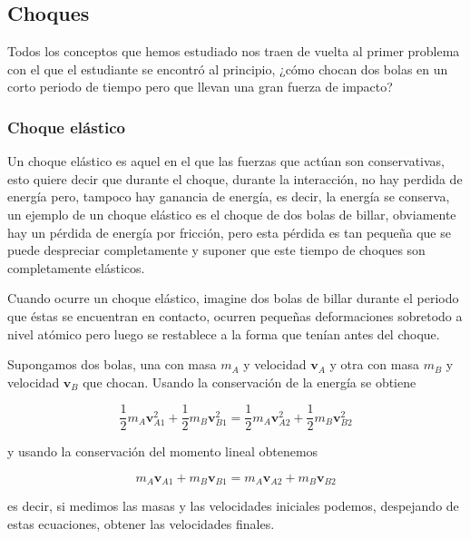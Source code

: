 \documentclass{article}
\begin{document}
\subsection{Choques}

Todos los conceptos que hemos estudiado nos traen de vuelta al primer problema con el que el estudiante se encontró al principio, ¿cómo chocan dos bolas en un corto periodo de tiempo pero que llevan una gran fuerza de impacto?

\subsubsection{Choque elástico}

Un choque elástico es aquel en el que las fuerzas que actúan son conservativas, esto quiere decir que durante el choque, durante la interacción, no hay perdida de energía pero, tampoco hay ganancia de energía, es decir, la energía se conserva, un ejemplo de un choque elástico es el choque de dos bolas de billar, obviamente hay un pérdida de energía por fricción, pero esta pérdida es tan pequeña que se puede despreciar completamente y suponer que este tiempo de choques son completamente elásticos.

Cuando ocurre un choque elástico, imagine dos bolas de billar durante el periodo que éstas se encuentran en contacto, ocurren pequeñas deformaciones sobretodo a nivel atómico pero luego se restablece a la forma que tenían antes del choque.

Supongamos dos bolas, una con  masa $m_{A}$ y velocidad  $\textbf{v}_{A}$ y otra con masa $m_{B}$ y velocidad  $\textbf{v}_{B}$ que chocan. Usando la conservación de la energía se obtiene

\begin{equation}
   \frac{1}{2} m_{A} \textbf{v}_{A1}^{2}+  \frac{1}{2} m_{B} \textbf{v}_{B1}^{2} = \frac{1}{2} m_{A}  \textbf{v}_{A2}^{2}+ \frac{1}{2} m_{B} \textbf{v}_{B2}^{2}
\end{equation}


y usando la conservación del momento lineal obtenemos

\begin{equation}
  m_{A} \textbf{v}_{A1} + m_{B} \textbf{v}_{B1} = m_{A} \textbf{v}_{A2} + m_{B} \textbf{v}_{B2}
\end{equation}

es decir, si medimos las masas y las velocidades iniciales podemos, despejando de estas ecuaciones, obtener las velocidades finales.
\end{document}
